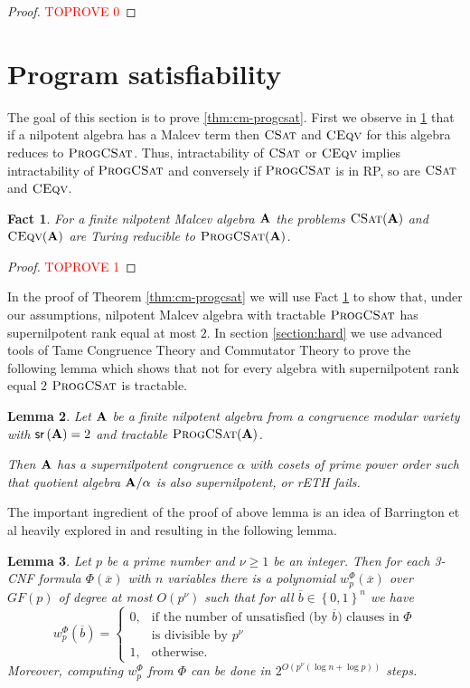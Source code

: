 \documentclass[11pt,a4paper]{amsart}
\newtheorem{lm}{Lemma}[section]
\newtheorem{fact}[lm]{Fact}
\newcommand{\rptime}{\textsf{RP}\xspace}
\newcommand{\m}[1]{{\uppercase {\bf{#1}}}}
\newcommand{\set}[1]{{\left\{ {#1} \right\} }}
\renewcommand{\geq}{\geqslant}
\renewcommand{\o}[1]{\overline {#1}}
\newcommand{\gProblem}[2]{\ensuremath{\operatorname{\textup{\textsc{{#2}}}}
		\ifthenelse{\equal{#1}{}}{}{\!\left( {#1} \right)}}}
\newcommand{\ceqv}[1]{\gProblem{#1}{CEqv}}
\newcommand{\csat}[1]{\gProblem{#1}{CSat}}
\newcommand{\progcsat}[1]{\gProblem{#1}{ProgCSat}}
\newcommand{\cm}{congruence modular }
\newcommand{\sr}[1]{{\mathsf{sr}\left(#1\right)}}
\newcommand{\rethh}{rETH\xspace}
\begin{document}
\begin{proof}\textcolor{red}{TOPROVE 0}\end{proof}

\section{Program satisfiability}
\label{section:progcsat}
The goal of this section is to prove \cref{thm:cm-progcsat}. First we observe in \cref{fact:red-to-progcsat} that if a nilpotent algebra has a Malcev term then \csat{} and \ceqv{} for this algebra reduces to \progcsat{}. Thus, intractability of \csat{} or \ceqv{} implies intractability of \progcsat{} and conversely if \progcsat{} is in \rptime, so are \csat{} and \ceqv{}.



\begin{fact}
\label{fact:red-to-progcsat}
For a finite nilpotent Malcev algebra $\m A$ the problems $\csat{\m A}$ and $\ceqv{\m A}$
are Turing reducible to $\progcsat{\m A}$.
\end{fact}

\begin{proof}\textcolor{red}{TOPROVE 1}\end{proof}
In the proof of Theorem \ref{thm:cm-progcsat} we will use Fact \ref{fact:red-to-progcsat} to show that, under our assumptions, nilpotent Malcev algebra with tractable \progcsat{} has supernilpotent rank equal at most $2$. In section \ref{section:hard} we use advanced tools of Tame Congruence Theory and Commutator Theory to prove the following lemma which shows that not for every algebra with supernilpotent rank equal $2$ \progcsat{} is tractable.

\begin{lm}
\label{lm:hard}
Let $\m A$ be a finite nilpotent algebra from a \cm variety with $\sr{\m A}=2$ and tractable $\progcsat{\m A}$.

Then $\m A$ has a supernilpotent congruence $\alpha$ with cosets of prime power order such that quotient algebra $\m A/\alpha$ is also supernilpotent, or \rethh fails.
\end{lm}

The important ingredient of the proof of above lemma is an idea of Barrington et al \cite{BarringtonBR94} heavily explored in \cite{idziakKK22LICS} and \cite{IdziakKKW22-icalp} resulting in the following lemma.

\begin{lm}
\label{lm:pseudo-and}
Let $p$ be a prime number and $\nu \geq 1$ be an integer.
Then for each 3-CNF formula $\Phi(\o x)$ with $n$ variables
there is a polynomial $w^\Phi_{p}(\o x)$ over  $GF(p)$
of degree at most $O(p^\nu)$
such that for all $\o b \in \set{0,1}^n$ we have
\[
w^\Phi_{p}(\o b) =
\left\{
\begin{array}{ll}
0, &\mbox{if the number of unsatisfied (by $\o b$) clauses in $\Phi$}\\
    &\mbox{is divisible by $p^\nu$}\\
1, &\mbox{otherwise.}
\end{array}
\right.
\]
Moreover, computing $w^\Phi_{p}$ from $\Phi$ can be done in $2^{O(p^\nu(\log n+\log p))}$ steps.
\end{lm}
\end{document}
